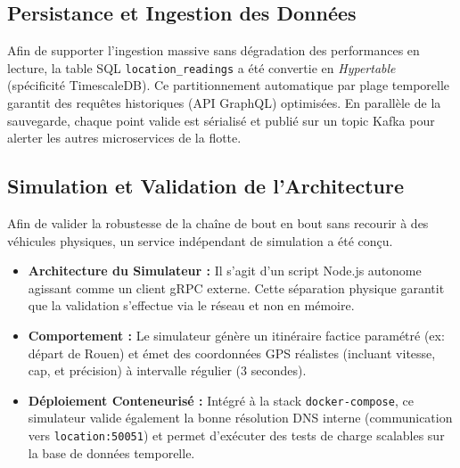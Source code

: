 \documentclass{article}
\begin{document}
\subsection{Persistance et Ingestion des Données}
Afin de supporter l'ingestion massive sans dégradation des performances en lecture, la table SQL \texttt{location\_readings} a été convertie en \textit{Hypertable} (spécificité TimescaleDB). Ce partitionnement automatique par plage temporelle garantit des requêtes historiques (API GraphQL) optimisées. En parallèle de la sauvegarde, chaque point valide est sérialisé et publié sur un topic Kafka pour alerter les autres microservices de la flotte.

\subsection{Simulation et Validation de l'Architecture}
Afin de valider la robustesse de la chaîne de bout en bout sans recourir à des véhicules physiques, un service indépendant de simulation a été conçu.
\begin{itemize}
    \item \textbf{Architecture du Simulateur :} Il s'agit d'un script Node.js autonome agissant comme un client gRPC externe. Cette séparation physique garantit que la validation s'effectue via le réseau et non en mémoire.
    \item \textbf{Comportement :} Le simulateur génère un itinéraire factice paramétré (ex: départ de Rouen) et émet des coordonnées GPS réalistes (incluant vitesse, cap, et précision) à intervalle régulier (3 secondes).
    \item \textbf{Déploiement Conteneurisé :} Intégré à la stack \texttt{docker-compose}, ce simulateur valide également la bonne résolution DNS interne (communication vers \texttt{location:50051}) et permet d'exécuter des tests de charge scalables sur la base de données temporelle.
\end{itemize}
\end{document}

